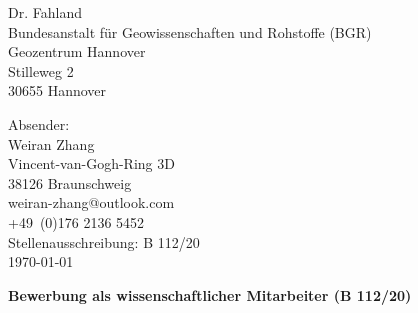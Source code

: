 
\begin{minipage}[t][2cm][t]{0.6\linewidth}
	\normalfont
Dr. Fahland \\[0.5em]
Bundesanstalt für Geowissenschaften und Rohstoffe (BGR)\\
Geozentrum Hannover\\
Stilleweg 2\\
30655 Hannover\\
	\vfill
\end{minipage}
\hfill
\begin{minipage}[t][5cm][t]{0.3\linewidth}
	\raggedleft
	\small{ \color{darkgray}
		Absender:\\\vspace{0.5em}Weiran Zhang\\ \vspace{0.5em}
		Vincent-van-Gogh-Ring 3D\\ 38126 Braunschweig\\\vspace{0.5em}
		weiran-zhang@outlook.com\\
		+49~(0)176 2136 5452\\}
	\vspace{0.5em}
Stellenausschreibung: B 112/20\\[0.5em]
 \today
	\vfill	
\end{minipage}
\begin{minipage}[t][1cm][t]{1\linewidth}
	\large\textbf{Bewerbung als wissenschaftlicher Mitarbeiter (B 112/20)\\[1em]}
\end{minipage}

